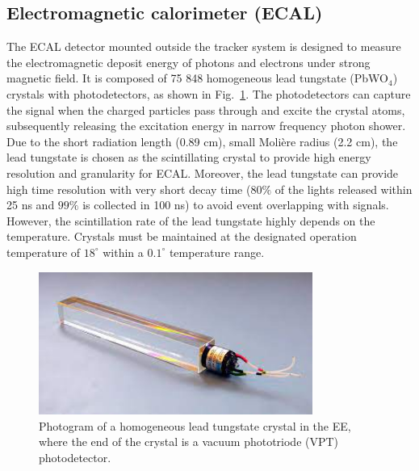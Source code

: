 \subsection{Electromagnetic calorimeter (ECAL)}
The ECAL detector mounted outside the tracker system is designed to measure the electromagnetic deposit energy of photons and electrons under strong magnetic field.
It is composed of 75 848 homogeneous lead tungstate (PbWO$_4$) crystals with photodetectors, as shown in Fig.~\ref{fig:cms_crystal}.
The photodetectors can capture the signal when the charged particles pass through and excite the crystal atoms, subsequently releasing the excitation energy in narrow frequency photon shower.
Due to the short radiation length (0.89 cm), small Molière radius (2.2 cm), the lead tungstate is chosen as the scintillating crystal to provide high energy resolution and granularity for ECAL.
Moreover, the lead tungstate can provide high time resolution with very short decay time ($80\%$ of the lights released within 25 ns and $99\%$ is collected in 100 ns) to avoid event overlapping with signals.
However, the scintillation rate of the lead tungstate highly depends on the temperature.
Crystals must be maintained at the designated operation temperature of $18^{\circ}$ within a $0.1^{\circ}$ temperature range.
\begin{figure}\centering
    \includegraphics[width=0.8\textwidth]{figure/cms_crystal.jpeg}
    \caption[Photogram of a homogeneous lead tungstate crystal in the EE.]
    {Photogram of a homogeneous lead tungstate crystal in the EE, where the end of the crystal is a vacuum phototriode (VPT) photodetector.}
    \label{fig:cms_crystal}
\end{figure}

